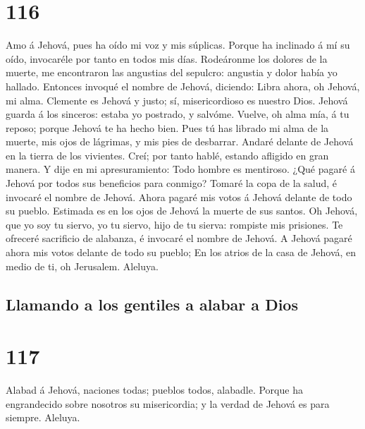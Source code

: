 \hypertarget{section-115}{%
\section{116}\label{section-115}}

 Amo á Jehová, pues ha oído mi voz y mis súplicas.
 Porque ha inclinado á mí su oído, invocaréle por tanto en
todos mis días.  Rodeáronme los dolores de la muerte, me
encontraron las angustias del sepulcro: angustia y dolor había yo
hallado.  Entonces invoqué el nombre de Jehová, diciendo:
Libra ahora, oh Jehová, mi alma.  Clemente es Jehová y
justo; sí, misericordioso es nuestro Dios.  Jehová guarda
á los sinceros: estaba yo postrado, y salvóme.  Vuelve, oh
alma mía, á tu reposo; porque Jehová te ha hecho bien. 
Pues tú has librado mi alma de la muerte, mis ojos de lágrimas, y mis
pies de desbarrar.  Andaré delante de Jehová en la tierra
de los vivientes.  Creí; por tanto hablé, estando
afligido en gran manera.  Y dije en mi apresuramiento:
Todo hombre es mentiroso.  ¿Qué pagaré á Jehová por todos
sus beneficios para conmigo?  Tomaré la copa de la salud,
é invocaré el nombre de Jehová.  Ahora pagaré mis votos á
Jehová delante de todo su pueblo.  Estimada es en los
ojos de Jehová la muerte de sus santos.  Oh Jehová, que
yo soy tu siervo, yo tu siervo, hijo de tu sierva: rompiste mis
prisiones.  Te ofreceré sacrificio de alabanza, é
invocaré el nombre de Jehová.  A Jehová pagaré ahora mis
votos delante de todo su pueblo;  En los atrios de la
casa de Jehová, en medio de ti, oh Jerusalem. Aleluya.

\hypertarget{llamando-a-los-gentiles-a-alabar-a-dios}{%
\subsection{Llamando a los gentiles a alabar a
Dios}\label{llamando-a-los-gentiles-a-alabar-a-dios}}

\hypertarget{section-116}{%
\section{117}\label{section-116}}

 Alabad á Jehová, naciones todas; pueblos todos, alabadle.
 Porque ha engrandecido sobre nosotros su misericordia; y
la verdad de Jehová es para siempre. Aleluya.

